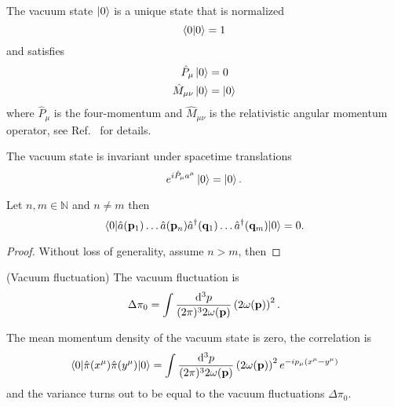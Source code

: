 \begin{definition}
	The vacuum state $\ket{0}$ is a unique state that is normalized
	\begin{equation}
		\braket{0}
		=
		1
	\end{equation}
	and satisfies
	\begin{align}
		\hat{P}_\mu
		\ket{0}
		&=
		0
		\\
		\hat{M}_{\mu\nu}
		\ket{0}
		&=
		\ket{0}
	\end{align}
	where $\hat{P}_\mu$ is the four-momentum and $\hat{M}_{\mu\nu}$ is the relativistic angular momentum operator, see Ref.~\cite[p.~270]{Greiner2013} for details.
\end{definition}
\begin{corollary}
	The vacuum state is invariant under spacetime translations
	\begin{equation}
		e^{i\hat{P}_\mu a^\mu}
		\ket{0}
		=
		\ket{0}
		.
	\end{equation}	
\end{corollary}
\begin{theorem}
	Let $n,m\in\mathbb{N}$ and $n\neq m$ then
	\begin{equation}
		\expval{
			\hat{a}(\vb{p}_1)
			\dots
			\hat{a}(\vb{p}_n)
			\hat{a}^\dagger(\vb{q}_1)
			\dots
			\hat{a}^\dagger(\vb{q}_m)
		}{0}
		=
		0
		.
	\end{equation}
\end{theorem}
\begin{proof}
	Without loss of generality, assume $n>m$, then
\end{proof}
\begin{definition}(Vacuum fluctuation)
	The vacuum fluctuation is
	\begin{equation}
		\Delta\pi_0
		=
		\int\frac{\dd[3]{p}}{(2\pi)^32\omega(\vb{p})}
		\left(2\omega(\vb{p})\right)^2
		.
	\end{equation}
\end{definition}
\begin{lemma}\label{thm:vacuum_state_momentum_density_observable}
	The mean momentum density of the vacuum state is zero, the correlation is
	\begin{equation}
		\expval{\hat\pi(x^\mu)\hat\pi(y^\mu)}{0}
		=
		\int\frac{\dd[3]{p}}{(2\pi)^32\omega(\vb{p})}
		\left(2\omega(\vb{p})\right)^2
		e^{-ip_\mu(x^\mu-y^\mu)}
	\end{equation}
	and the variance turns out to be equal to the vacuum fluctuations $\Delta\pi_0$.
\end{lemma}

